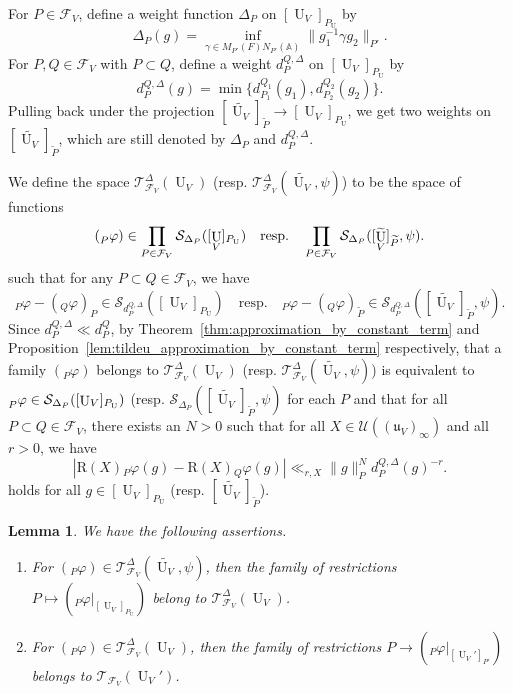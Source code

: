 \documentclass[letterpaper,11pt]{amsart}
\newcommand{\fu}{\mathfrak{u}}
\newcommand{\bA}{\mathbb{A}}
\newcommand{\cF}{\mathcal{F}}
\newcommand{\cS}{\mathcal{S}}
\newcommand{\cT}{\mathcal{T}}
\newcommand{\cU}{\mathcal{U}}
\newcommand{\<}{\negthickspace}
\providecommand{\aabs}[1]{\lVert#1\rVert}
\DeclareMathOperator{\U}{U}
\theoremstyle{definition}
\theoremstyle{plain}
\newtheorem{lemma}[definition]{Lemma}
\theoremstyle{remark}
\numberwithin{equation}{section}
\begin{document}
For $P \in \cF_V$, define a weight function $\Delta_P$ on $[\U_V]_{P_{\U}}$ by
    \[
    \Delta_P(g) = \inf_{\gamma \in M_{P'}(F)N_{P'}(\bA)}
    \aabs{g_1^{-1} \gamma g_2}_{P'}.
    \]
For $P,Q \in \cF_V$ with $P \subset Q$, define a weight
$d_P^{Q,\Delta}$ on $[\U_V]_{P_{\U}}$ by
    \[
    d_P^{Q,\Delta}(g) = \min \{ d_{P_1}^{Q_1}(g_1), d_{P_2}^{Q_2}(g_2) \}.
    \]
Pulling back under the projection $[\widetilde{\U_V}]_{\widetilde{P}} \to
[\U_V]_{P_{\U}}$, we get two weights on $[\widetilde{\U_V}]_{\widetilde{P}}$,
which are still denoted by $\Delta_P$ and $d_P^{Q,\Delta}$.

We define the space $\cT_{\cF_V}^\Delta(\U_V)$ (resp.
$\cT_{\cF_V}^\Delta(\widetilde{\U_V},\psi)$) to be the space of functions
    \begin{equation} \label{eq:TDelta_first_condition}
     (\prescript{}{P}{\varphi}) \in \prod_{P \in \cF_V} \cS_{\Delta_P}([\U_V]_{P_{\U}})
     \quad \text{resp.} \quad
     \prod_{P \in \cF_V} \cS_{\Delta_P}([\widetilde{\U_V}]_{\widetilde{P}},\psi).
    \end{equation}
such that for any $P \subset Q \in \cF_V$, we have
    \[
    {}_P \varphi - ({}_Q \varphi)_P \in \cS_{d_P^{Q,\Delta}}([\U_V]_{P_{\U}})
    \quad \text{resp.}
    \quad {}_P \varphi - ({}_Q \varphi)_{\widetilde{P}}
    \in \cS_{d_P^{Q,\Delta}}([\widetilde{\U_V}]_{\widetilde{P}},\psi).
    \]
Since $d_P^{Q,\Delta} \ll d_P^Q$, by
Theorem~\ref{thm:approximation_by_constant_term} and
Proposition~\ref{lem:tildeu_approximation_by_constant_term} respectively,
that a family $({}_P \varphi)$ belongs to $\cT_{\cF_V}^\Delta(\U_V)$ (resp.
$\cT_{\cF_V}^\Delta(\widetilde{\U_V}, \psi)$) is equivalent to
$\prescript{}{P}{\varphi} \in \cS_{\Delta_P}([\U_V]_{P_{\U}})$ (resp.
$\cS_{\Delta_P}([\widetilde{\U_V}]_{\widetilde{P}}, \psi)$ for each $P$ and that
for all $P \subset Q \in \cF_V$, there exists an $N>0$ such that for all $X \in
\cU((\fu_{V})_{\infty})$ and all $r>0$, we have
    \begin{equation} \label{eq:TDelta_equivalent}
      \left| \mathrm{R}(X) {}_P\varphi(g)
       - \mathrm{R}(X) {}_Q \varphi(g) \right| \ll_{r,X}
       \|g\|_P^N d_P^{Q,\Delta}(g)^{-r}.
    \end{equation}
holds for all $g \in [\U_V]_{P_{\U}}$ (resp. $[\widetilde{\U_V}]_{\widetilde{P}}$).


\begin{lemma} \label{lem:T_space_relation}
We have the following assertions.
\begin{enumerate}
\item For $({}_P \varphi) \in \cT^\Delta_{\cF_V}(\widetilde{\U_V},\psi)$, then
the family of restrictions $P \mapsto ({}_P \varphi|_{[\U_V]_{P_{\U}}})$
belong to $\cT^\Delta_{\cF_V}(\U_V)$.


\item For $({}_P \varphi) \in \cT^\Delta_{\cF_V}(\U_V)$, then the family of
    restrictions $P \to ({}_P \varphi|_{[\U_V']_{P'}})$
    belongs to $\cT_{\cF_V}(\U_V')$.
\end{enumerate}
\end{lemma}
\end{document}
